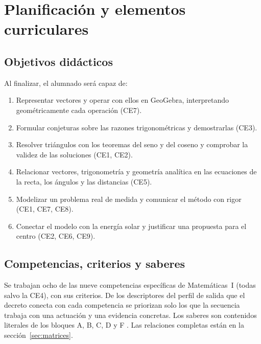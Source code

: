 \section{Planificación y elementos curriculares}

\subsection{Objetivos didácticos}
Al finalizar, el alumnado será capaz de:
\begin{enumerate}[label=\textbf{O\arabic*.},leftmargin=2.4em]
  \item Representar vectores y operar con ellos en GeoGebra, interpretando geométricamente cada operación (CE7).
  \item Formular conjeturas sobre las razones trigonométricas y demostrarlas (CE3).
  \item Resolver triángulos con los teoremas del seno y del coseno y comprobar la validez de las soluciones (CE1, CE2).
  \item Relacionar vectores, trigonometría y geometría analítica en las ecuaciones de la recta, los ángulos y las distancias (CE5).
  \item Modelizar un problema real de medida y comunicar el método con rigor (CE1, CE7, CE8).
  \item Conectar el modelo con la energía solar y justificar una propuesta para el centro (CE2, CE6, CE9).
\end{enumerate}

\subsection{Competencias, criterios y saberes}
Se trabajan ocho de las nueve competencias específicas de Matemáticas~I (todas salvo la CE4), con sus criterios. De los descriptores del perfil de salida que el decreto conecta con cada competencia \parencite[pp.~321--324]{decreto64} se priorizan solo los que la secuencia trabaja con una actuación y una evidencia concretas. Los saberes son contenidos literales de los bloques A, B, C, D y F \parencite[pp.~325--328]{decreto64}. Las relaciones completas están en la sección~\ref{sec:matrices}.

